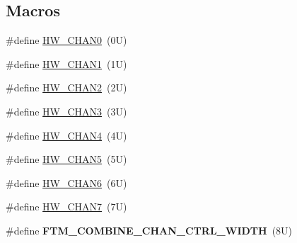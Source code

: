 \subsection*{Macros}
\begin{DoxyCompactItemize}
\item 
\#define \hyperlink{group__ftm__hal_gab07f9ba36567d9841387018178ce769b}{H\+W\+\_\+\+C\+H\+A\+N0}~(0\+U)
\item 
\#define \hyperlink{group__ftm__hal_gad7bc026f98654ab8a0a869c54d6c09c9}{H\+W\+\_\+\+C\+H\+A\+N1}~(1\+U)
\item 
\#define \hyperlink{group__ftm__hal_gab759c806b3708a402717876c439b5a51}{H\+W\+\_\+\+C\+H\+A\+N2}~(2\+U)
\item 
\#define \hyperlink{group__ftm__hal_ga68ecd23bb7e7b8601d55f66422fa8e89}{H\+W\+\_\+\+C\+H\+A\+N3}~(3\+U)
\item 
\#define \hyperlink{group__ftm__hal_ga02e988fcd4bb2747633b9c23327aadc1}{H\+W\+\_\+\+C\+H\+A\+N4}~(4\+U)
\item 
\#define \hyperlink{group__ftm__hal_ga257bd9a10992b23e10d10058578f46a4}{H\+W\+\_\+\+C\+H\+A\+N5}~(5\+U)
\item 
\#define \hyperlink{group__ftm__hal_ga220e408682ae8119e251b4232f722af2}{H\+W\+\_\+\+C\+H\+A\+N6}~(6\+U)
\item 
\#define \hyperlink{group__ftm__hal_ga51e9ba0dd60ca19d76a24469dff34914}{H\+W\+\_\+\+C\+H\+A\+N7}~(7\+U)
\item 
\#define {\bfseries F\+T\+M\+\_\+\+C\+O\+M\+B\+I\+N\+E\+\_\+\+C\+H\+A\+N\+\_\+\+C\+T\+R\+L\+\_\+\+W\+I\+D\+TH}~(8\+U)\hypertarget{group__ftm__hal_ga699ef33c9bb4a9a27db251537eda74a2}{}\label{group__ftm__hal_ga699ef33c9bb4a9a27db251537eda74a2}

\end{DoxyCompactItemize}
